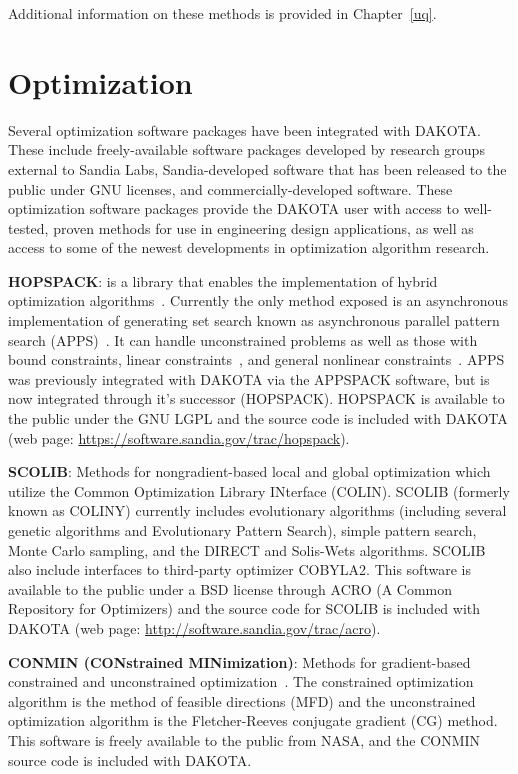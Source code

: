 Additional information on these methods is provided in Chapter~\ref{uq}.

\section{Optimization}\label{capabilities:optimization1}

Several optimization software packages have been integrated with
DAKOTA. These include freely-available software packages developed by
research groups external to Sandia Labs, Sandia-developed software
that has been released to the public under GNU licenses, and
commercially-developed software. These optimization software packages
provide the DAKOTA user with access to well-tested, proven methods for
use in engineering design applications, as well as access to some of
the newest developments in optimization algorithm research.

\textbf{HOPSPACK}: is a library that enables the implementation of
hybrid optimization algorithms~\cite{Plantenga2009}.  Currently the
only method exposed is an asynchronous implementation of generating
set search known as asynchronous parallel pattern search
(APPS)~\cite{GrKo06}.  It can handle unconstrained problems as well as
those with bound constraints, linear constraints~\cite{GrKoLe08}, and
general nonlinear constraints~\cite{GrKo07}.  APPS was previously
integrated with DAKOTA via the APPSPACK software, but is now
integrated through it's successor (HOPSPACK).  HOPSPACK is available
to the public under the GNU LGPL and the source code is included with
DAKOTA (web page: \url{https://software.sandia.gov/trac/hopspack}).

\textbf{SCOLIB}: Methods for nongradient-based local and global
optimization which utilize the Common Optimization Library INterface
(COLIN). %
SCOLIB
(formerly known as COLINY) currently includes evolutionary algorithms
(including several genetic algorithms and Evolutionary Pattern
Search), simple pattern search, Monte Carlo sampling, and the DIRECT
and Solis-Wets algorithms. SCOLIB also include interfaces to
third-party optimizer COBYLA2.  This software is available to the
public under a BSD license through ACRO (A Common Repository for
Optimizers) and the source code for SCOLIB is included with DAKOTA
(web page: \url{http://software.sandia.gov/trac/acro}).

\textbf{CONMIN (CONstrained MINimization)}: Methods for gradient-based
constrained and unconstrained optimization~\cite{Van78}. The constrained
optimization algorithm is the method of feasible directions (MFD) and
the unconstrained optimization algorithm is the Fletcher-Reeves
conjugate gradient (CG) method. This software is freely available to
the public from NASA, and the CONMIN source code is included with
DAKOTA.

